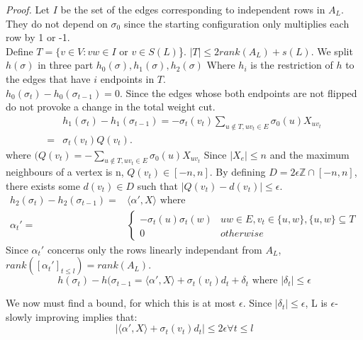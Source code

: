 \documentclass[12pt]{article}
\begin{document}
\textit{Proof.} Let $I$ be the set of the edges corresponding to independent rows in $A_L$. They do not depend on $\sigma_0$ since the starting configuration only multiplies each row by 1 or -1.\\
Define $T = \{v \in V: vw \in I \text{ or } v \in S(L)$\}. $|T| \leq 2 rank(A_L) + s(L)$. 
We split $h(\sigma)$ in three part $h_0(\sigma), h_1(\sigma), h_2(\sigma)$ Where $h_i$ is the restriction of $h$ to the edges that have $i$ endpoints in $T$. \\
$h_0(\sigma_t) - h_0(\sigma_{t -1}) = 0$. Since the edges whose both endpoints are not flipped do not provoke a change in the total weight cut. \\
\begin{equation*}
\begin{split}
&h_1(\sigma_t) - h_1(\sigma_{t-1}) = -\sigma_t(v_t)\sum_{u \not\in T, uv_t \in E}\sigma_0(u)X_{uv_t} \\
=& \sigma_t(v_t)Q(v_t).
\end{split}
\end{equation*}
where $(Q(v_t) = -\sum_{u \not\in T, uv_t \in E}\sigma_0(u)X_{uv_t}$ Since $|X_e| \leq n$ and the maximum neighbours of a vertex is n, $Q(v_t) \in [-n, n]$. By defining $D = 2\epsilon\mathbb Z \cap [-n, n]$, there exists some $d(v_t) \in D$ such that $|Q(v_t) - d(v_t)| \leq \epsilon$.\\
\begin{equation*}
\begin{split}
h_2(\sigma_t) - h_2(\sigma_{t-1}) = &\langle\alpha ', X \rangle \text{ where }\\
\alpha_t ' =  &
\begin{cases}
-\sigma_t(u)\sigma_t(w) & uw \in E, v_t \in \{u, w\}, \{u, w\} \subseteq T \\
0 & otherwise
\end{cases}
\end{split}
\end{equation*}
Since $\alpha_t'$ concerns only the rows linearly independant from $A_L$, $rank([\alpha_t']_{t \leq l}) = rank(A_L)$. \\
\begin{equation*}
h(\sigma_t) - h(\sigma_{t-1} = \langle\alpha ', X \rangle +   \sigma_t(v_t)d_t + \delta_t \text{    where }|\delta_t| \leq \epsilon
\end{equation*}

We now must find a bound, for which this is at most $\epsilon$. Since  $|\delta_t| \leq \epsilon$, L is $\epsilon$-slowly improving implies that: 
\begin{equation*}
| \langle\alpha ', X \rangle +   \sigma_t(v_t)d_t| \leq 2\epsilon \forall t \leq l
\end{equation*}
\end{document}
